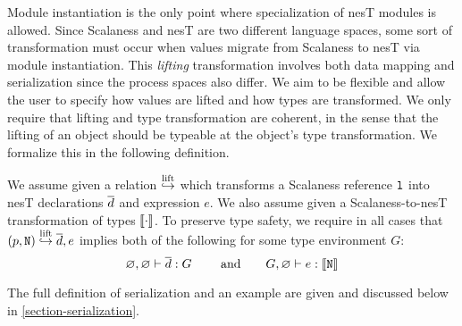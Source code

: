 Module instantiation is the only point where specialization of nesT
modules is allowed.
Since Scalaness and nesT are two different language spaces, some sort
of transformation must occur when values migrate from Scalaness to
nesT via module instantiation. This \emph{lifting} transformation
involves both data mapping and serialization since the process spaces
also differ.  We aim to be flexible and allow the user to specify how
values are lifted and how types are transformed. We only require that
lifting and type transformation are coherent, in the sense that the
lifting of an object should be typeable at the object's type
transformation.  We formalize this in the
following definition.%
\begin{definition}
\label{def-lifting}
We assume given a relation $\ser{\jstore}$ which transforms a
Scalaness reference $\tt{l}$ into nesT declarations $\vect{d}$ and 
expression $e$.  We also assume given a Scalaness-to-nesT
transformation of types $\codt{\cdot}$. To preserve type safety, we
require in all cases that $\jref{p}{N} \ser{\jstore} \vect{d}, e$
implies both of the following for some type environment $G$:
$$
\varnothing, \varnothing \vdash \vect{d} : \tenv \qquad \text{ and} \qquad
 \tenv, \varnothing \vdash e : \codt{\tt{N}} 
$$
\end{definition}
The full definition of serialization and an example are given and
discussed below in \autoref{section-serialization}.

\jmodsemanticsfig

